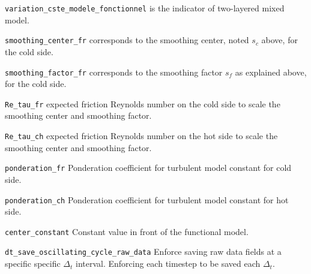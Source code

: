 \texttt{variation\_cste\_modele\_fonctionnel} is the indicator of two-layered mixed model.

\texttt{smoothing\_center\_fr} corresponds to the smoothing center, noted $s_c$ above, for the cold side.

\texttt{smoothing\_factor\_fr} corresponds to the smoothing factor $s_f$ as explained above, for the cold side.

\texttt{Re\_tau\_fr} expected friction Reynolds number on the cold side to scale the smoothing center and smoothing factor.

\texttt{Re\_tau\_ch} expected friction Reynolds number on the hot side to scale the smoothing center and smoothing factor.

\texttt{ponderation\_fr} Ponderation coefficient for turbulent model constant for cold side.

\texttt{ponderation\_ch} Ponderation coefficient for turbulent model constant for hot side.

\texttt{center\_constant} Constant value in front of the functional model.

\texttt{dt\_save\_oscillating\_cycle\_raw\_data} Enforce saving raw data fields at a specific specific $\Delta_t$ interval. Enforcing each timestep to be saved each $\Delta_t$.

